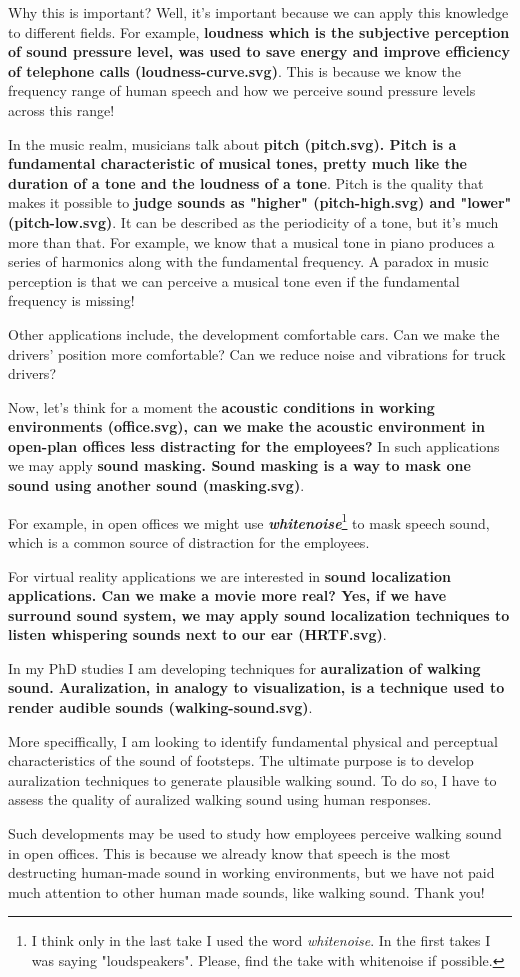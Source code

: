 \documentclass[12pt, hidelinks, doc]{article}
\begin{document}
Why this is important? Well, it's important because we can apply this knowledge to different fields.  For  example, \textbf{loudness which is the subjective perception of sound pressure level, was used to save energy and improve efficiency of telephone calls (loudness-curve.svg)}.  This is because we know the frequency range of human speech and how we perceive sound pressure levels across this range!

In the music realm, musicians talk about \textbf{pitch (pitch.svg).  Pitch is a fundamental characteristic of musical tones, pretty much like the duration of a tone and the loudness of a tone}.  Pitch is the quality that makes it possible to \textbf{judge sounds as "higher" (pitch-high.svg) and "lower" (pitch-low.svg)}. It can be described as the periodicity of a tone, but it's much more than that.  For example, we know that a musical tone in piano produces a series of harmonics along with the fundamental frequency.  A paradox in music perception is that we can perceive a musical tone even if the fundamental frequency is missing!


Other applications include, the development comfortable cars.  Can we make the drivers' position more comfortable?  Can we reduce noise and vibrations for truck drivers?


Now, let's think for a moment the \textbf{acoustic conditions in working environments (office.svg), can we make the acoustic environment in open-plan offices less distracting for the employees?}  In such applications we may apply \textbf{sound masking.  Sound masking is a way to mask one sound using another sound (masking.svg)}.

For example, in open offices we might use \textbf{\emph{whitenoise}}\footnote{I think only in the last take I used the word \emph{whitenoise}.  In the first takes I was saying "loudspeakers".  Please, find the take with whitenoise if possible.} to mask speech sound, which is a common source of distraction for the employees.

For virtual reality applications we are interested in \textbf{sound localization applications.  Can we make a movie more real?  Yes, if we have surround sound system, we may apply sound localization techniques to listen whispering sounds next to our ear (HRTF.svg)}.

In my PhD studies I am developing techniques for \textbf{auralization of walking sound. Auralization, in analogy to visualization, is a technique used to render audible sounds (walking-sound.svg)}.

More speciffically, I am looking to identify fundamental physical and perceptual characteristics of the sound of footsteps. The ultimate purpose is to develop auralization techniques to generate plausible walking sound.  To do so, I have to assess the quality of auralized walking sound using human responses.

Such developments may be used to study how employees perceive walking sound in open offices.  This is because we already know that speech is the most destructing human-made sound in working environments, but we have not paid much attention to other human made sounds, like walking sound. Thank you!
\end{document}
